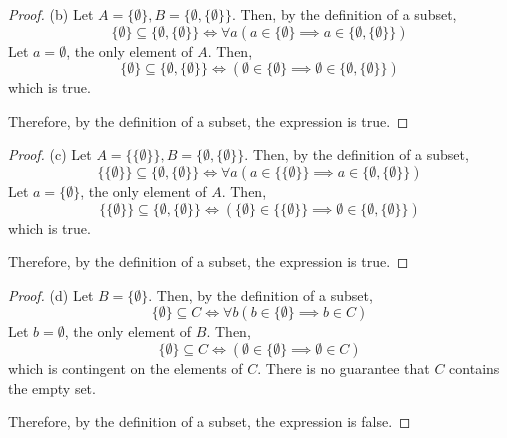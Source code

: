 \documentclass[10pt]{article}
\theoremstyle{definition}
\theoremstyle{plain}
\begin{document}
\begin{proof}{(b)}
  Let $A=\{\emptyset\}, B = \{\emptyset,\{\emptyset\}\}$. Then, by the definition of a subset,
  \begin{equation*}
    \{\emptyset\} \subseteq \{\emptyset,\{\emptyset\}\} \iff \forall a(a\in \{\emptyset\} \implies a\in \{\emptyset,\{\emptyset\}\})
  \end{equation*}
  Let $a=\emptyset$, the only element of $A$. Then,
  \begin{equation*}
    \{\emptyset\} \subseteq \{\emptyset,\{\emptyset\}\} \iff (\emptyset \in \{\emptyset\} \implies \emptyset \in \{\emptyset,\{\emptyset\}\})
  \end{equation*}
  which is true. \\

  \par Therefore, by the definition of a subset, the expression is true.
\end{proof}

\begin{proof}{(c)}
  Let $A=\{\{\emptyset\}\}, B = \{\emptyset,\{\emptyset\}\}$. Then, by the definition of a subset,
  \begin{equation*}
    \{\{\emptyset\}\} \subseteq \{\emptyset,\{\emptyset\}\} \iff \forall a(a\in \{\{\emptyset\}\} \implies a\in \{\emptyset,\{\emptyset\}\})
  \end{equation*}
  Let $a=\{\emptyset\}$, the only element of $A$. Then,
  \begin{equation*}
    \{\{\emptyset\}\} \subseteq \{\emptyset,\{\emptyset\}\} \iff (\{\emptyset\} \in \{\{\emptyset\}\} \implies \emptyset \in \{\emptyset,\{\emptyset\}\})
  \end{equation*}
  which is true. \\

  \par Therefore, by the definition of a subset, the expression is true.
\end{proof}


\begin{proof}{(d)}
  Let $B=\{\emptyset\}$. Then, by the definition of a subset,
  \begin{equation*}
    \{\emptyset\} \subseteq C \iff \forall b(b\in \{\emptyset\} \implies b\in C)
  \end{equation*}
  Let $b=\emptyset$, the only element of $B$. Then,
  \begin{equation*}
    \{\emptyset\} \subseteq C \iff (\emptyset \in \{\emptyset\} \implies \emptyset \in C)
  \end{equation*}
  which is contingent on the elements of $C$. There is no guarantee that $C$ contains the empty set. \\

  \par Therefore, by the definition of a subset, the expression is false.
\end{proof}
\end{document}
